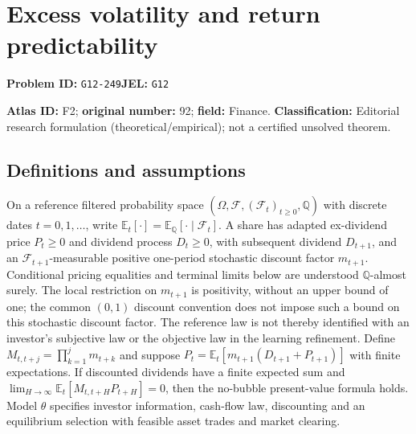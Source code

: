 \documentclass[11pt,a4paper]{article}
\begin{document}
\section*{Excess volatility and return predictability}
\textbf{Problem ID:} \texttt{G12-249}\quad \textbf{JEL:} \texttt{G12}\par
\label{problem:OP-0092}
\label{audited:ECON-037}
\label{atlas:prob:F2}

\noindent\textbf{Atlas ID:} F2; \textbf{original number:} 92; \textbf{field:} Finance. \textbf{Classification:} Editorial research formulation (theoretical/empirical); not a certified unsolved theorem.

\subsection*{Definitions and assumptions}
On a reference filtered probability space $(\Omega,\mathcal F,(\mathcal F_t)_{t\ge0},\mathbb Q)$ with discrete dates $t=0,1,\ldots$, write $\mathbb E_t[\cdot]=\mathbb E_{\mathbb Q}[\cdot\mid\mathcal F_t]$. A share has adapted ex-dividend price $P_t\ge0$ and dividend process $D_t\ge0$, with subsequent dividend $D_{t+1}$, and an $\mathcal F_{t+1}$-measurable positive one-period stochastic discount factor $m_{t+1}$. Conditional pricing equalities and terminal limits below are understood $\mathbb Q$-almost surely. The local restriction on $m_{t+1}$ is positivity, without an upper bound of one; the common $(0,1)$ discount convention does not impose such a bound on this stochastic discount factor. The reference law is not thereby identified with an investor's subjective law or the objective law in the learning refinement. Define $M_{t,t+j}=\prod_{k=1}^{j}m_{t+k}$ and suppose $P_t=\mathbb E_t[m_{t+1}(D_{t+1}+P_{t+1})]$ with finite expectations. If discounted dividends have a finite expected sum and $\lim_{H\to\infty}\mathbb E_t[M_{t,t+H}P_{t+H}]=0$, then the no-bubble present-value formula holds. Model $\theta$ specifies investor information, cash-flow law, discounting and an equilibrium selection with feasible asset trades and market clearing.
\end{document}
